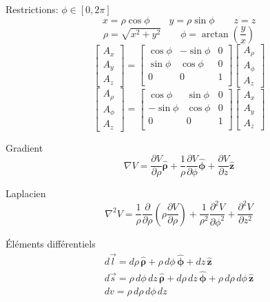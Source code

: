 \documentclass[10pt,landscape]{article}
\newcommand{\extraline}{\vspace{1em}}
\newcommand{\uvec}[1]{\ensuremath{\boldsymbol{\hat{#1}}}}
\begin{document}
\begin{multicols}{3}
Restrictions: $\phi\in[0,2\pi]$
\[ x = \rho\cos\phi \qquad y = \rho\sin\phi \qquad z=z  \]
\[ \rho = \sqrt{x^2 + y^2} \qquad \phi = \arctan\left(\frac{y}{x}\right) \]
%
\[
\begin{bmatrix}
	A_x \\ A_y \\ A_z
\end{bmatrix}
=
\begin{bmatrix}
	\cos\phi & -\sin\phi & 0 \\
	\sin\phi & \cos\phi & 0 \\
	0 & 0 & 1 \\
\end{bmatrix}
\begin{bmatrix}
	A_\rho \\ A_\phi \\ A_z
\end{bmatrix}
\]
\[
\begin{bmatrix}
	A_\rho \\ A_\phi \\ A_z
\end{bmatrix}
=
\begin{bmatrix}
	\cos\phi & \sin\phi & 0 \\
	-\sin\phi & \cos\phi & 0 \\
	0 & 0 & 1 \\
\end{bmatrix}
\begin{bmatrix}
	A_x \\ A_y \\ A_z
\end{bmatrix}
\]

\extraline
Gradient
\[ \nabla V = \frac{\partial V}{\partial \rho}\uvec{\rho} + \frac{1}{\rho}\frac{\partial V}{\partial \phi}\uvec{\phi} + \frac{\partial V}{\partial z}\uvec{z} \]

Laplacien
\[ \nabla^2 V = 
\frac{1}{\rho} \frac{\partial}{\partial \rho} \left( \rho\frac{\partial V}{\partial \rho} \right)
+ \frac{1}{\rho^2}\frac{\partial^2 V}{\partial \phi^2}
+ \frac{\partial^2 V}{\partial z^2} \]

Éléments différentiels
\begin{gather*}
d\vec{l} = d\rho\,\uvec{\rho} + \rho\,d\phi\,\uvec{\phi} + dz\,\uvec{z} \\
d\vec{s} = \rho\,d\phi\,dz\,\uvec{\rho} + d\rho\,dz\,\uvec{\phi} + \rho\,d\rho\,d\phi\,\uvec{z} \\
dv = \rho\,d\rho\,d\phi\,dz
\end{gather*}


\end{multicols}
\end{document}
